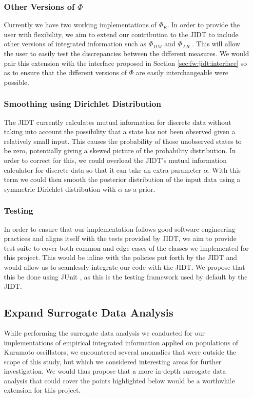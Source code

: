 \documentclass[a4paper,11pt]{article}
\begin{document}
\subsubsection{Other Versions of $\Phi$}
\label{sec:fw:jidt:other-phi}
Currently we have two working implementations of $\Phi_{E}$. In order to provide the user with flexibility, we aim to extend our contribution to the JIDT to include other versions of integrated information such as $\Phi_{DM}$ and $\Phi_{AR}$ \cite{Barrett2011}. This will allow the user to easily test the discrepancies between the different measures. We would pair this extension with the interface proposed in Section \ref{sec:fw:jidt:interface} so as to ensure that the different versions of $\Phi$ are easily interchangeable were possible.

\subsubsection{Smoothing using Dirichlet Distribution}
\label{sec:fw:jidt:dirichlet}

The JIDT currently calculates mutual information for discrete data without taking into account the possibility that a state has not been observed given a relatively small input. This causes the probability of those unobserved states to be zero, potentially giving a skewed picture of the probability distribution. In order to correct for this, we could overload the JIDT's mutual information calculator for discrete data so that it can take an extra parameter $\alpha$. With this term we could then smooth the posterior distribution of the input data using a symmetric Dirichlet distribution with $\alpha$ as a prior.

\subsubsection{Testing}
\label{sec:fw:jidt:testing}
In order to ensure that our implementation follows good software engineering practices and aligns itself with the tests provided by JIDT, we aim to provide test suite to cover both common and edge cases of the classes we implemented for this project. This would be inline with the policies put forth by the JIDT and would allow us to seamlessly integrate our code with the JIDT. We propose that this be done using JUnit \cite{JUnit}, as this is the testing framework used by default by the JIDT.

\subsection{Expand Surrogate Data Analysis}
\label{sec:fw:surrogate}
While performing the surrogate data analysis we conducted for our implementations of empirical integrated information applied on populations of Kuramoto oscillators, we encountered several anomalies that were outside the scope of this study, but which we considered interesting areas for further investigation. We would thus propose that a more in-depth surrogate data analysis that could cover the points highlighted below would be a worthwhile extension for this project.
\end{document}
